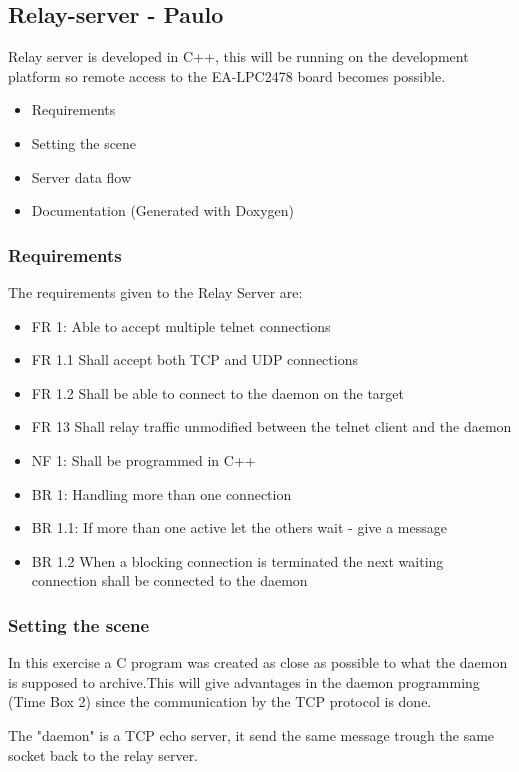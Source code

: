 \subsection{Relay-server - Paulo}
Relay server is developed in C++, this will be running on the development platform so remote access to the EA-LPC2478 board becomes possible.

\begin{itemize}
	\item Requirements
	\item Setting the scene
	\item Server data flow
	\item Documentation (Generated with Doxygen)
\end{itemize}

\subsubsection{Requirements}
The requirements given to the Relay Server are:

\begin{itemize}
	\item FR 1: Able to accept multiple telnet connections
	\item FR 1.1 Shall accept both TCP and UDP connections
 	\item FR 1.2 Shall be able to connect to the daemon on the target
 	\item FR 13 Shall relay traffic unmodified between the telnet client and the daemon
 	\item NF 1: Shall be programmed in C++
 	\item BR 1: Handling more than one connection
 	\item BR 1.1: If more than one active let the others wait - give a message
 	\item BR 1.2 When a blocking connection is terminated the next waiting connection shall be connected to the daemon
\end{itemize}

\subsubsection{Setting the scene}
In this exercise a C program was created as close as possible to what the daemon is supposed to archive.This will give advantages in the daemon programming (Time Box 2) since the communication by the TCP protocol is done.

The "daemon" is a TCP echo server, it send the same message trough the same socket back to the relay server.

